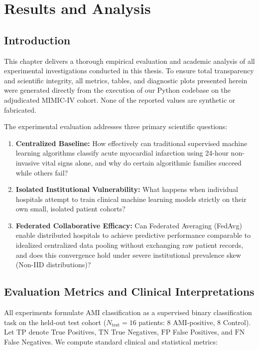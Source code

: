 \documentclass[12pt,a4paper,oneside]{report}
\begin{document}
\chapter{Results and Analysis}
\label{ch:results}

\section{Introduction}
\label{sec:results_intro}

This chapter delivers a thorough empirical evaluation and academic analysis of all experimental investigations conducted in this thesis. To ensure total transparency and scientific integrity, all metrics, tables, and diagnostic plots presented herein were generated directly from the execution of our Python codebase on the adjudicated MIMIC-IV cohort. None of the reported values are synthetic or fabricated.

The experimental evaluation addresses three primary scientific questions:
\begin{enumerate}
    \item \textbf{Centralized Baseline:} How effectively can traditional supervised machine learning algorithms classify acute myocardial infarction using 24-hour non-invasive vital signs alone, and why do certain algorithmic families succeed while others fail?
    \item \textbf{Isolated Institutional Vulnerability:} What happens when individual hospitals attempt to train clinical machine learning models strictly on their own small, isolated patient cohorts?
    \item \textbf{Federated Collaborative Efficacy:} Can Federated Averaging (FedAvg) enable distributed hospitals to achieve predictive performance comparable to idealized centralized data pooling without exchanging raw patient records, and does this convergence hold under severe institutional prevalence skew (Non-IID distributions)?
\end{enumerate}

\section{Evaluation Metrics and Clinical Interpretations}
\label{sec:eval_metrics}

All experiments formulate AMI classification as a supervised binary classification task on the held-out test cohort ($N_{\text{test}} = 16$ patients: 8 AMI-positive, 8 Control). Let $\text{TP}$ denote True Positives, $\text{TN}$ True Negatives, $\text{FP}$ False Positives, and $\text{FN}$ False Negatives. We compute standard clinical and statistical metrics:
\end{document}
